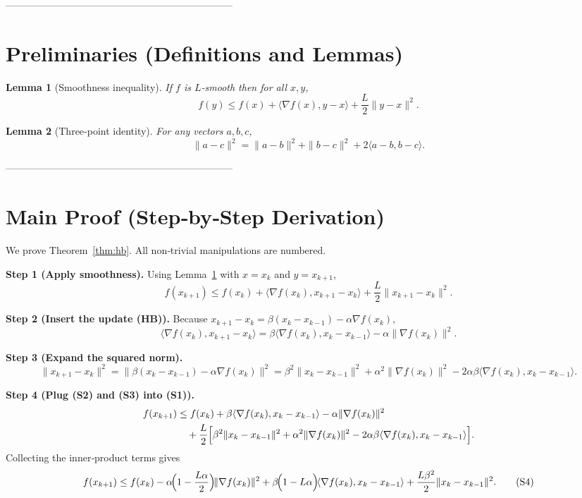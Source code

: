 \documentclass{article}
\newtheorem{lemma}{Lemma}
\begin{document}
---------------------------------------------------------------------

\section*{Preliminaries (Definitions and Lemmas)}

\begin{lemma}[Smoothness inequality]\label{lem:smooth}
If $f$ is $L$‑smooth then for all $x,y$,
\[
f(y)\le f(x)+\langle\nabla f(x),y-x\rangle+\frac{L}{2}\|y-x\|^{2}.
\tag{L1}
\]
\end{lemma}

\begin{lemma}[Three‑point identity]\label{lem:three}
For any vectors $a,b,c$,
\[
\|a-c\|^{2}= \|a-b\|^{2}+\|b-c\|^{2}+2\langle a-b,b-c\rangle .
\tag{L2}
\]
\end{lemma}

---------------------------------------------------------------------

\section*{Main Proof (Step‑by‑Step Derivation)}

We prove Theorem~\ref{thm:hb}.  All non‑trivial manipulations are numbered.

\bigskip
\noindent\textbf{Step 1 (Apply smoothness).}  
Using Lemma~\ref{lem:smooth} with $x=x_{k}$ and $y=x_{k+1}$,
\[
f(x_{k+1})\le f(x_{k})+\langle\nabla f(x_{k}),x_{k+1}-x_{k}\rangle
+\frac{L}{2}\|x_{k+1}-x_{k}\|^{2}.
\tag{S1}
\]

\noindent\textbf{Step 2 (Insert the update (HB)).}  
Because $x_{k+1}-x_{k}= \beta(x_{k}-x_{k-1})-\alpha\nabla f(x_{k})$,
\[
\langle\nabla f(x_{k}),x_{k+1}-x_{k}\rangle
= \beta\langle\nabla f(x_{k}),x_{k}-x_{k-1}\rangle
-\alpha\|\nabla f(x_{k})\|^{2}.
\tag{S2}
\]

\noindent\textbf{Step 3 (Expand the squared norm).}  
\[
\|x_{k+1}-x_{k}\|^{2}
= \|\beta(x_{k}-x_{k-1})-\alpha\nabla f(x_{k})\|^{2}
= \beta^{2}\|x_{k}-x_{k-1}\|^{2}
+\alpha^{2}\|\nabla f(x_{k})\|^{2}
-2\alpha\beta\langle\nabla f(x_{k}),x_{k}-x_{k-1}\rangle .
\tag{S3}
\]

\noindent\textbf{Step 4 (Plug (S2) and (S3) into (S1)).}  
\begin{align*}
f(x_{k+1})
&\le f(x_{k})
+\beta\langle\nabla f(x_{k}),x_{k}-x_{k-1}\rangle
-\alpha\|\nabla f(x_{k})\|^{2}\\
&\quad+\frac{L}{2}\Bigl[\beta^{2}\|x_{k}-x_{k-1}\|^{2}
+\alpha^{2}\|\nabla f(x_{k})\|^{2}
-2\alpha\beta\langle\nabla f(x_{k}),x_{k}-x_{k-1}\rangle\Bigr].
\end{align*}
Collecting the inner‑product terms gives
\[
f(x_{k+1})\le f(x_{k})
-\alpha\!\Bigl(1-\frac{L\alpha}{2}\Bigr)\!\|\nabla f(x_{k})\|^{2}
+\beta\!\Bigl(1-L\alpha\Bigr)\!\langle\nabla f(x_{k}),x_{k}-x_{k-1}\rangle
+\frac{L\beta^{2}}{2}\|x_{k}-x_{k-1}\|^{2}.
\tag{S4}
\]
\end{document}
